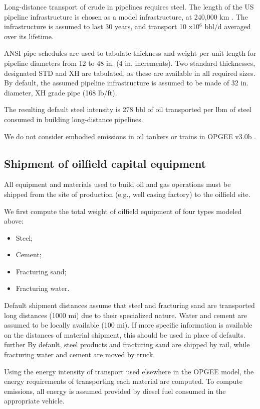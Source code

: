 \documentclass[11pt]{report}
\newcommand{\version}{v3.0b }
\begin{document}
Long-distance transport of crude in pipelines requires steel. The length of the US pipeline infrastructure is chosen as a model  infrastructure, at 240,000 km \cite{CIA2013}. The infrastructure is assumed to last 30 years, and transport 10 x10$^6$ bbl/d averaged over  its lifetime.

ANSI pipe schedules \cite[Table 9.7]{Arnold2007} are used to tabulate thickness and weight per unit length for pipeline diameters from 12 to 48 in. (4 in. increments). Two standard thicknesses, designated STD and XH are tabulated, as these are available in all required sizes. By default, the assumed pipeline infrastructure is assumed to be made of 32 in. diameter, XH grade pipe (168 lb/ft). 

The resulting default steel intensity is 278 bbl of oil  transported per lbm of steel consumed in building long-distance pipelines.

We do not consider embodied emissions in oil tankers or trains in OPGEE \version.

\subsection{Shipment of oilfield capital equipment}

All equipment and materials used to build oil and gas operations must be shipped from the site of production (e.g., well casing factory) to the oilfield site.

We first compute the total weight of oilfield equipment of four types modeled above:
\begin{itemize}
\item Steel;
\item Cement;
\item Fracturing sand;
\item Fracturing water.
\end{itemize}

Default shipment distances  assume that steel and fracturing sand are transported long distances (1000 mi) due to their specialized nature. Water and cement are assumed to be locally available (100 mi). If more specific information is available on the distances of material shipment, this should be used in place of defaults. further By default, steel products and fracturing sand are shipped by rail, while fracturing water and cement are moved by truck. 

Using the energy intensity of transport used elsewhere in the OPGEE model, the energy requirements of transporting each material are computed. To compute emissions, all energy is assumed provided by diesel fuel consumed in the appropriate vehicle. 
\end{document}
